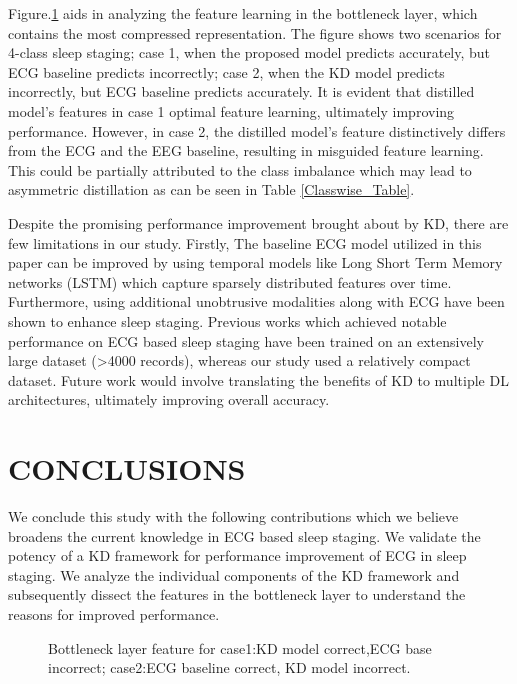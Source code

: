 \documentclass[letterpaper, 10 pt, conference]{ieeeconf}
\begin{document}
Figure.\ref{fig:Feature_plots} aids in analyzing the feature learning in the bottleneck layer, which contains the most compressed representation. The figure shows two scenarios for 4-class sleep staging; 
case 1, when the proposed model predicts accurately, but ECG baseline predicts incorrectly;
case 2, when the KD model predicts incorrectly, but ECG baseline predicts accurately.
It is evident that distilled model's features in case 1 optimal feature learning, ultimately improving performance. However, in case 2, the distilled model's feature distinctively differs from the ECG and the EEG baseline, resulting in misguided feature learning. This could be partially attributed to the class imbalance which may lead to asymmetric distillation as can be seen in Table \ref{Classwise_Table}.

Despite the promising performance improvement brought about by KD, there are few limitations in our study. Firstly, The baseline ECG model utilized in this paper can be improved by using temporal models like Long Short Term Memory networks (LSTM) which capture sparsely distributed features over time.  Furthermore, using additional unobtrusive modalities along with ECG have been shown to enhance sleep staging. Previous works \cite{sridhar2020deep}\cite{li2018deep} which achieved notable performance on ECG based sleep staging have been trained on an extensively large dataset (>4000 records), whereas our study used a relatively compact dataset. Future work would involve translating the benefits of KD to multiple DL architectures, ultimately improving overall accuracy.


\section{CONCLUSIONS}

We conclude this study with the following contributions which we believe broadens the current knowledge in ECG based sleep staging.
We validate the potency of a KD framework for performance improvement of ECG in sleep staging.
We analyze the individual components of the KD framework and subsequently dissect the features in the bottleneck layer to understand the reasons for improved performance.   


\begin{figure}[t]
    \centering
{}
    
    \caption{Bottleneck layer feature for case1:KD model correct,ECG base incorrect; case2:ECG baseline correct, KD model incorrect.}
    \label{fig:Feature_plots}
\vspace{-1.5em}
\end{figure}

\addtolength{\textheight}{-12cm}   





\end{document}
